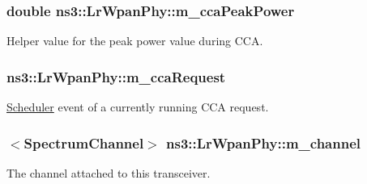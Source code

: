 \subsubsection[{\texorpdfstring{m\+\_\+cca\+Peak\+Power}{m_ccaPeakPower}}]{\setlength{\rightskip}{0pt plus 5cm}double ns3\+::\+Lr\+Wpan\+Phy\+::m\+\_\+cca\+Peak\+Power\hspace{0.3cm}{\ttfamily [private]}}\hypertarget{classns3_1_1LrWpanPhy_a7b801d5943cf39ea427eb3cfd036166e}{}\label{classns3_1_1LrWpanPhy_a7b801d5943cf39ea427eb3cfd036166e}
Helper value for the peak power value during C\+CA. 
\subsubsection[{\texorpdfstring{m\+\_\+cca\+Request}{m_ccaRequest}}]{ ns3\+::\+Lr\+Wpan\+Phy\+::m\+\_\+cca\+Request\hspace{0.3cm}{\ttfamily [private]}}\hypertarget{classns3_1_1LrWpanPhy_a5fc2fce788ea008a00078c62682c02d0}{}\label{classns3_1_1LrWpanPhy_a5fc2fce788ea008a00078c62682c02d0}
\hyperlink{classns3_1_1Scheduler}{Scheduler} event of a currently running C\+CA request. 
\subsubsection[{\texorpdfstring{m\+\_\+channel}{m_channel}}]{$<${\bf Spectrum\+Channel}$>$ ns3\+::\+Lr\+Wpan\+Phy\+::m\+\_\+channel\hspace{0.3cm}{\ttfamily [private]}}\hypertarget{classns3_1_1LrWpanPhy_a6ea4a904afe3b256bc001c40efe496e1}{}\label{classns3_1_1LrWpanPhy_a6ea4a904afe3b256bc001c40efe496e1}
The channel attached to this transceiver. 
